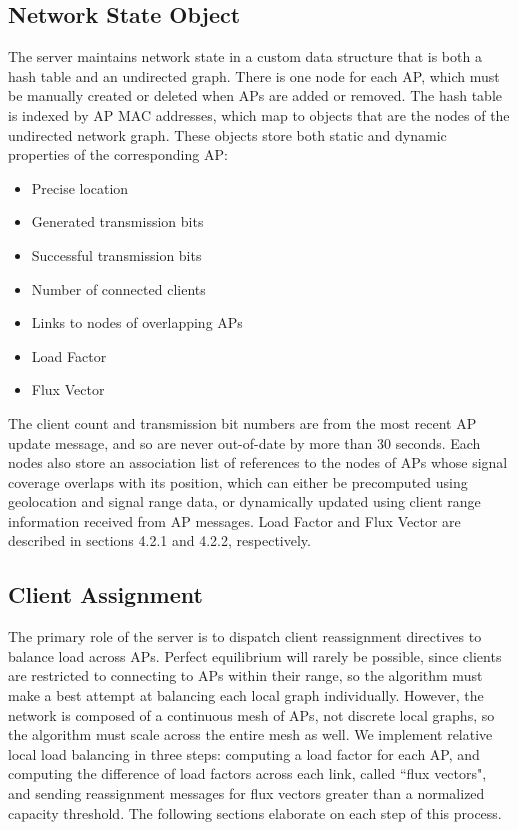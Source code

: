 \documentclass[10pt,journal,compsoc]{IEEEtran}
\begin{document}
		\subsection{Network State Object}
		The server maintains network state in a custom data structure that is both a hash table and an undirected graph. There is one node for each AP, which must be manually created or deleted when APs are added or removed. The hash table is indexed by AP MAC addresses, which map to objects that are the nodes of the undirected network graph. These objects store both static and dynamic properties of the corresponding AP:
		\begin{itemize}
			\item Precise location
			\item Generated transmission bits
			\item Successful transmission bits
			\item Number of connected clients
			\item Links to nodes of overlapping APs
			\item Load Factor
			\item Flux Vector
		\end{itemize}
		The client count and transmission bit numbers are from the most recent AP update message, and so are never out-of-date by more than 30 seconds. Each nodes also store an association list of references to the nodes of APs whose signal coverage overlaps with its position, which can either be precomputed using geolocation and signal range data, or dynamically updated using client range information received from AP messages. Load Factor and Flux Vector are described in sections 4.2.1 and 4.2.2, respectively.
		
		\subsection{Client Assignment}
		The primary role of the server is to dispatch client reassignment directives to balance load across APs. Perfect equilibrium will rarely be possible, since clients are restricted to connecting to APs within their range, so the algorithm must make a best attempt at balancing each local graph individually. However, the network is composed of a continuous mesh of APs, not discrete local graphs, so the algorithm must scale across the entire mesh as well. We implement relative local load balancing in three steps: computing a load factor for each AP, and computing the difference of load factors across each link, called ``flux vectors", and sending reassignment messages for flux vectors greater than a normalized capacity threshold. The following sections elaborate on each step of this process.
		
\end{document}
